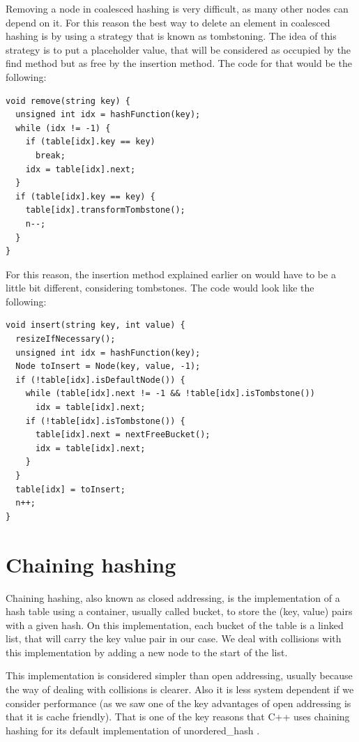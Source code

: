 Removing a node in coalesced hashing is very difficult, as many other nodes can depend on it. For this reason the best way to delete an element in coalesced hashing is by using a strategy that is known as tombstoning. The idea of this strategy is to put a placeholder value, that will be considered as occupied by the find method but as free by the insertion method. The code for that would be the following:

\begin{lstlisting}
void remove(string key) {
  unsigned int idx = hashFunction(key);
  while (idx != -1) {
    if (table[idx].key == key) 
      break;
    idx = table[idx].next;         
  }
  if (table[idx].key == key) {
    table[idx].transformTombstone();
    n--;
  }
}
\end{lstlisting}

For this reason, the insertion method explained earlier on would have to be a little bit different, considering tombstones. The code would look like the following:

\begin{lstlisting}
void insert(string key, int value) {
  resizeIfNecessary();
  unsigned int idx = hashFunction(key);
  Node toInsert = Node(key, value, -1);
  if (!table[idx].isDefaultNode()) {
    while (table[idx].next != -1 && !table[idx].isTombstone())
      idx = table[idx].next; 
    if (!table[idx].isTombstone()) {
      table[idx].next = nextFreeBucket();
      idx = table[idx].next;
    }
  }
  table[idx] = toInsert;
  n++;
}
\end{lstlisting}

\section{Chaining hashing}

Chaining hashing, also known as closed addressing, is the implementation of a hash table using a container, usually called bucket, to store the (key, value) pairs with a given hash. On this implementation, each bucket of the table is a linked list, that will carry the key value pair in our case. We deal with collisions with this implementation by adding a new node to the start of the list.

This implementation is considered simpler than open addressing, usually because the way of dealing with collisions is clearer. Also it is less system dependent if we consider performance (as we saw one of the key advantages of open addressing is that it is cache friendly). That is one of the key reasons that C++ uses chaining hashing for its default implementation of unordered\_hash \citep{HashTableProposal}.

